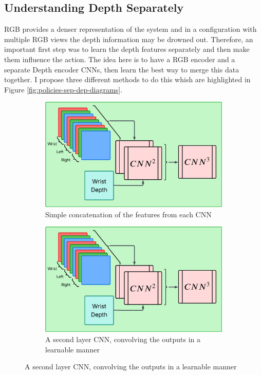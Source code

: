 \subsection{Understanding Depth Separately}\label{subsec:policies-understand-depth-sep}
RGB provides a denser representation of the system and in a configuration with multiple RGB views the depth information may be drowned out. Therefore, an important first step was to learn the depth features separately and then make them influence the action. The idea here is to have a RGB encoder and a separate Depth encoder CNNs, then learn the best way to merge this data together. I propose three different methods to do this whish are highlighted in Figure \ref{fig:policies-sep-dep-diagrams}.

\begin{figure}[htpb]
  \centering
  \begin{subfigure}{0.45\linewidth}
    \centering
    \includegraphics[width=0.7\linewidth]{assets/cam-comb/policies/wlr_d-feats-diagram.png}
    \caption{Simple concatenation of the features from each CNN}\label{subfig:policies-wlr_d}
  \end{subfigure}
  \hfill
  \begin{subfigure}{0.45\linewidth}
    \centering
    \includegraphics[width=0.7\linewidth]{assets/cam-comb/policies/wlr_d-feats-diagram.png}
    \caption{A second layer CNN, convolving the outputs in a learnable manner}\label{subfig:policies-wrl_d-feats}

\end{subfigure}
\end{figure}

